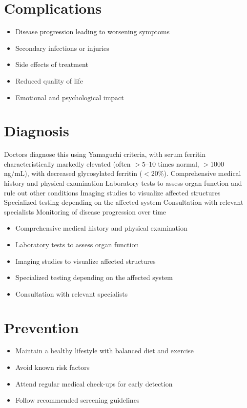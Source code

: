 \section{Complications}
\begin{itemize}[noitemsep]
  \item Disease progression leading to worsening symptoms
  \item Secondary infections or injuries
  \item Side effects of treatment
  \item Reduced quality of life
  \item Emotional and psychological impact
\end{itemize}
\section{Diagnosis}
Doctors diagnose this using Yamaguchi criteria, with serum ferritin characteristically markedly elevated (often $>$5--10 times normal, $>$1000 ng/mL), with decreased glycosylated ferritin ($<$20\%). Comprehensive medical history and physical examination Laboratory tests to assess organ function and rule out other conditions Imaging studies to visualize affected structures Specialized testing depending on the affected system Consultation with relevant specialists Monitoring of disease progression over time

\begin{itemize}[noitemsep]
  \item Comprehensive medical history and physical examination
  \item Laboratory tests to assess organ function
  \item Imaging studies to visualize affected structures
  \item Specialized testing depending on the affected system
  \item Consultation with relevant specialists
\end{itemize}
\section{Prevention}
\begin{itemize}[noitemsep]
  \item Maintain a healthy lifestyle with balanced diet and exercise
  \item Avoid known risk factors
  \item Attend regular medical check-ups for early detection
  \item Follow recommended screening guidelines
\end{itemize}
